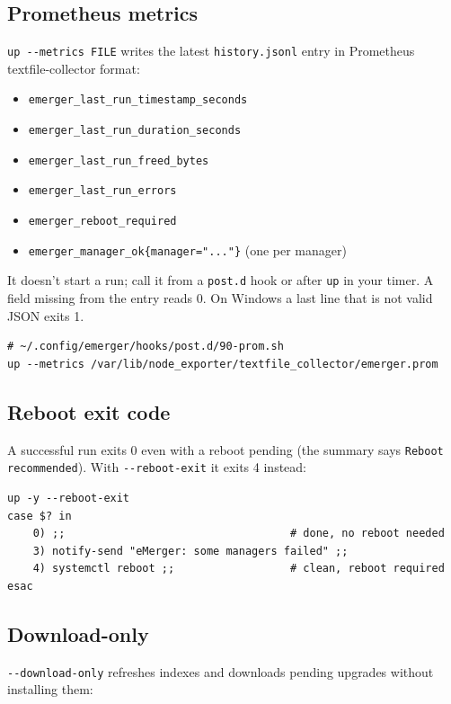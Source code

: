 \documentclass[11pt,a4paper]{article}
\begin{document}
\subsection{Prometheus metrics}
\texttt{up -{}-metrics FILE} writes the latest \texttt{history.jsonl}
entry in Prometheus textfile-collector format:

\begin{itemize}
  \item \texttt{emerger\_last\_run\_timestamp\_seconds}
  \item \texttt{emerger\_last\_run\_duration\_seconds}
  \item \texttt{emerger\_last\_run\_freed\_bytes}
  \item \texttt{emerger\_last\_run\_errors}
  \item \texttt{emerger\_reboot\_required}
  \item \texttt{emerger\_manager\_ok\{manager="..."\}} (one per manager)
\end{itemize}

It doesn't start a run; call it from a \texttt{post.d} hook or after
\texttt{up} in your timer. A field missing from the entry reads 0. On
Windows a last line that is not valid JSON exits 1.

\begin{lstlisting}[language=bashplus]
# ~/.config/emerger/hooks/post.d/90-prom.sh
up --metrics /var/lib/node_exporter/textfile_collector/emerger.prom
\end{lstlisting}

\subsection{Reboot exit code}
A successful run exits 0 even with a reboot pending (the summary says
\texttt{Reboot recommended}). With \texttt{-{}-reboot-exit} it exits 4
instead:

\begin{lstlisting}[language=bashplus]
up -y --reboot-exit
case $? in
    0) ;;                                   # done, no reboot needed
    3) notify-send "eMerger: some managers failed" ;;
    4) systemctl reboot ;;                  # clean, reboot required
esac
\end{lstlisting}

\subsection{Download-only}
\texttt{-{}-download-only} refreshes indexes
and downloads pending upgrades without installing them:
\end{document}

